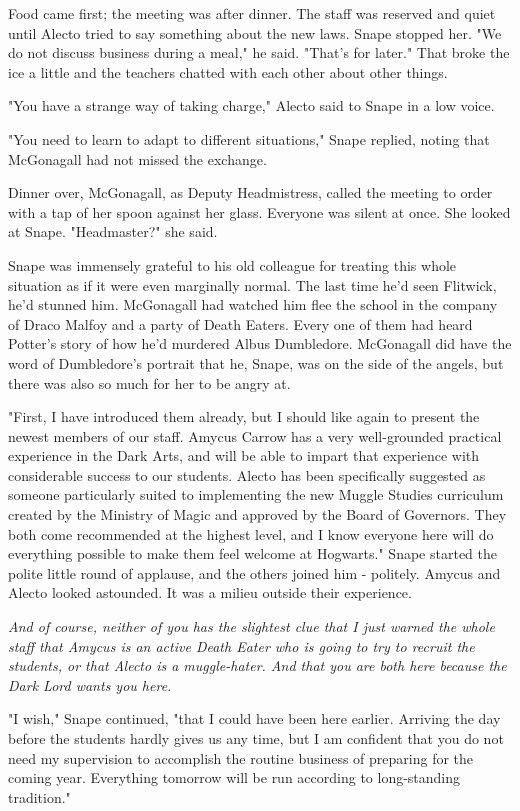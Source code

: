 \documentclass[a4paper,11pt]{article}
\begin{document}
Food came first; the meeting was after dinner. The staff was reserved and quiet until Alecto tried to say something about the new laws. Snape stopped her. "We do not discuss business during a meal," he said. "That's for later." That broke the ice a little and the teachers chatted with each other about other things.

"You have a strange way of taking charge," Alecto said to Snape in a low voice.

"You need to learn to adapt to different situations," Snape replied, noting that McGonagall had not missed the exchange.

Dinner over, McGonagall, as Deputy Headmistress, called the meeting to order with a tap of her spoon against her glass. Everyone was silent at once. She looked at Snape. "Headmaster?" she said.

Snape was immensely grateful to his old colleague for treating this whole situation as if it were even marginally normal. The last time he'd seen Flitwick, he'd stunned him. McGonagall had watched him flee the school in the company of Draco Malfoy and a party of Death Eaters. Every one of them had heard Potter's story of how he'd murdered Albus Dumbledore. McGonagall did have the word of Dumbledore's portrait that he, Snape, was on the side of the angels, but there was also so much for her to be angry at.

"First, I have introduced them already, but I should like again to present the newest members of our staff. Amycus Carrow has a very well-grounded practical experience in the Dark Arts, and will be able to impart that experience with considerable success to our students. Alecto has been specifically suggested as someone particularly suited to implementing the new Muggle Studies curriculum created by the Ministry of Magic and approved by the Board of Governors. They both come recommended at the highest level, and I know everyone here will do everything possible to make them feel welcome at Hogwarts." Snape started the polite little round of applause, and the others joined him - politely. Amycus and Alecto looked astounded. It was a milieu outside their experience.

\emph{And of course, neither of you has the slightest clue that I just warned the whole staff that Amycus is an active Death Eater who is going to try to recruit the students, or that Alecto is a muggle-hater. And that you are both here because the Dark Lord wants you here.}

"I wish," Snape continued, "that I could have been here earlier. Arriving the day before the students hardly gives us any time, but I am confident that you do not need my supervision to accomplish the routine business of preparing for the coming year. Everything tomorrow will be run according to long-standing tradition."
\end{document}
